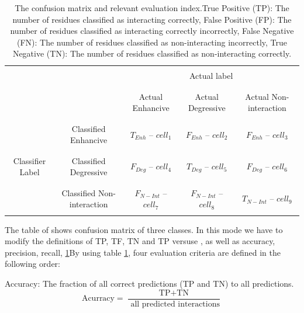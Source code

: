 \documentclass{bmcart}
\begin{document}
\begin{table}[h!]
	\centering
	\begin{tabular}{|c|c|c|c|c|}
		\cline{3-5}
		\multicolumn{2}{c}{}&\multicolumn{3}{|c|}{}\\
		\multicolumn{2}{c}{}&\multicolumn{3}{|c|}{Actual label}\\
		\multicolumn{2}{c}{}&\multicolumn{3}{|c|}{}\\
		\cline{3-5}
		\multicolumn{2}{c|}{}&&&\\
		\multicolumn{2}{c|}{} & Actual Enhancive & Actual Degressive & Actual Non-interaction\\
		\multicolumn{2}{c|}{}&&&\\
		\cline{1-5}
		&&&&\\
		\multirow{7}{*}{Classifier Label} & Classified Enhancive & $T_{Enh}$ -- $cell_1$	 & $F_{Enh}$ -- $cell_2$&$F_{Enh}$ -- $cell_3$\\
		&&&&\\
		\cline{2-5}
		&&&&\\
		&Classified Degressive & $F_{Deg}$ -- $cell_4$ & $T_{Deg}$ -- $cell_5$&$F_{Deg}$ -- $cell_6$\\
		&&&&\\
		\cline{2-5}
		&&&&\\
		&Classified Non-interaction &$F_{N-Int}$ -- $cell_7$&$F_{N-Int}$ -- $cell_8$&$T_{N-Int}$ -- $cell_9$\\
		&&&&\\
		\cline{1-5}
	\end{tabular}
	\newline
	\caption{The confusion matrix and relevant evaluation index.True Positive (TP): The number of residues classified as interacting correctly, False Positive (FP): The number of residues classified as interacting correctly incorrectly, False Negative (FN): The number of residues classified as non-interacting incorrectly, True Negative (TN): The number of residues classified as non-interacting correctly.}
	\label{confusion_matrix_temp}
\end{table}

The table of shows confusion matrix of three classes. In this mode we have to modify the definitions of TP, TF, TN and TP versuse , as well as accuracy, precision, recall, \ref{confusion_matrix_temp}By using table \ref{confusion_matrix_temp}, four evaluation criteria are defined in the following order:

Accuracy: The fraction of all correct predictions (TP and TN) to all predictions.
$$ \mbox{Acurracy} =  \frac{ \mbox{TP} + \mbox{TN}}{\mbox{ all predicted interactions}} $$
\end{document}
